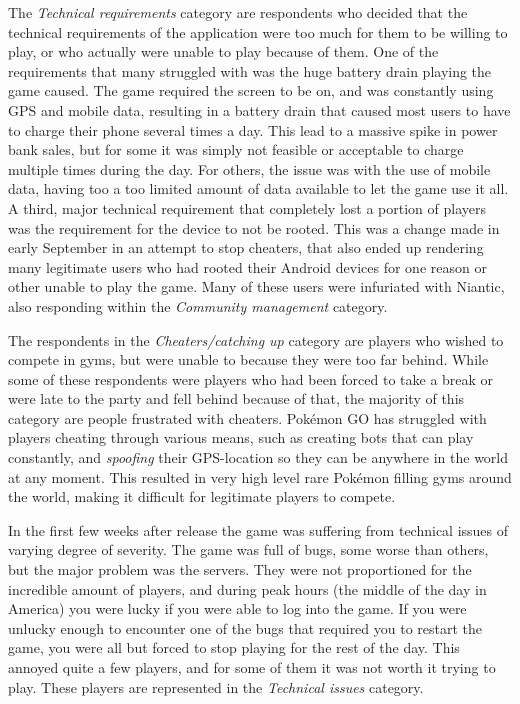 The \emph{Technical requirements} category are respondents who decided that the technical requirements of the application were too much for them to be willing to play, or who actually were unable to play because of them. One of the requirements that many struggled with was the huge battery drain playing the game caused. The game required the screen to be on, and was constantly using GPS and mobile data, resulting in a battery drain that caused most users to have to charge their phone several times a day. This lead to a massive spike in power bank sales, but for some it was simply not feasible or acceptable to charge multiple times during the day. For others, the issue was with the use of mobile data, having too a too limited amount of data available to let the game use it all. A third, major technical requirement that completely lost a portion of players was the requirement for the device to not be rooted. This was a change made in early September in an attempt to stop cheaters, that also ended up rendering many legitimate users who had rooted their Android devices for one reason or other unable to play the game. Many of these users were infuriated with Niantic, also responding within the \emph{Community management} category.

The respondents in the \emph{Cheaters/catching up} category are players who wished to compete in gyms, but were unable to because they were too far behind. While some of these respondents were players who had been forced to take a break or were late to the party and fell behind because of that, the majority of this category are people frustrated with cheaters. Pokémon GO has struggled with players cheating through various means, such as creating bots that can play constantly, and \emph{spoofing} their GPS-location so they can be anywhere in the world at any moment. This resulted in very high level rare Pokémon filling gyms around the world, making it difficult for legitimate players to compete.

In the first few weeks after release the game was suffering from technical issues of varying degree of severity. The game was full of bugs, some worse than others, but the major problem was the servers. They were not proportioned for the incredible amount of players, and during peak hours (the middle of the day in America) you were lucky if you were able to log into the game. If you were unlucky enough to encounter one of the bugs that required you to restart the game, you were all but forced to stop playing for the rest of the day. This annoyed quite a few players, and for some of them it was not worth it trying to play. These players are represented in the \emph{Technical issues} category.

